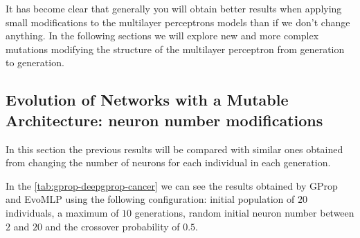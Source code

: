 \documentclass[runningheads]{llncs}
\begin{document}
It has become clear that generally you will obtain better results when applying
small modifications to the multilayer perceptrons models than if we don't
change anything. In the following sections we will explore new and more complex
mutations modifying the structure of the multilayer perceptron from generation
to generation.


\subsection{Evolution of Networks with a Mutable Architecture: neuron number modifications}


In this section the previous results will be compared with similar ones
obtained from changing the number of neurons for each individual in each
generation.


In the \autoref{tab:gprop-deepgprop-cancer} we can see the results obtained by
GProp and {\sf EvoMLP} using the following configuration: initial population of
$20$ individuals, a maximum of $10$ generations, random initial neuron number
between $2$ and $20$ and the crossover probability of $0.5$.
\end{document}
